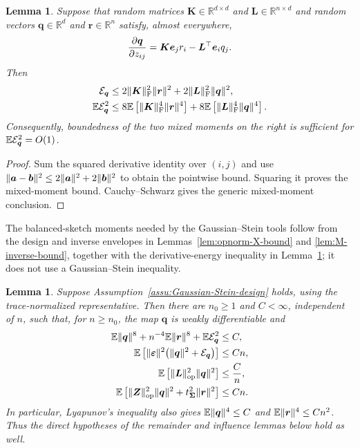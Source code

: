 \documentclass{article}
\theoremstyle{plain}
\newtheorem{lemma}[theorem]{Lemma}
\theoremstyle{definition}
\theoremstyle{definition}
\DeclarePairedDelimiter\norm{\lVert}{\rVert}
\def\R{{\mathbb{R}}}
\def\E{{\mathbb{E}}}
\def\mathbold{\boldsymbol}
\def\ba{\mathbold{a}}\def\bfa{\mathbold{a}}\def\ahat{\widehat{a}}\def\atil{\widetilde{a}}
\def\bb{\mathbold{b}}\def\bhat{\widehat{b}}\def\btil{\widetilde{b}}
\def\bK{\mathbold{K}}\def\hbK{{\widehat{\bK}}}\def\tbK{{\widetilde{\bK}}}
\def\bL{\mathbold{L}}\def\hbL{{\widehat{\bL}}}\def\tbL{{\widetilde{\bL}}}
\def\bq{\mathbold{q}}\def\qhat{\widehat{q}}\def\qtil{\widetilde{q}}\def\qbar{{\overline q}}
\def\br{\mathbold{r}}\def\rhat{\widehat{r}}\def\rtil{\widetilde{r}}\def\rbar{{\overline r}}
\def\be{\mathbold{e}}
\def\bZ{\mathbold{Z}}\def\hbZ{{\widehat{\bZ}}}\def\tbZ{{\widetilde{\bZ}}}
\def\ep{\varepsilon}\def\eps{\epsilon}\def\veps{\varepsilon}
\def\bep{ {\mathbold{\ep} }}
\def\bSigma{\mathbold{\Sigma}}\def\hbSigma{{\widehat{\bSigma}}}
\begin{document}
\begin{lemma}
\label{lem:derivative-energy-from-inverse-moments}
Suppose that random matrices $\bK\in\R^{d\times d}$ and
$\bL\in\R^{n\times d}$ and random vectors $\bq\in\R^d$ and
$\br\in\R^n$ satisfy, almost everywhere,
\begin{align*}
    \pdv{\bq}{z_{ij}}
       =\bK\be_jr_i-\bL^\top\be_iq_j.
\end{align*}
Then
\begin{align*}
    \calE_{\bq}
    &\leq2\norm{\bK}_{\rm F}^2\norm{\br}^2
       +2\norm{\bL}_{\rm F}^2\norm{\bq}^2,\\
    \E\calE_{\bq}^2
    &\leq8\E\left[\norm{\bK}_{\rm F}^4\norm{\br}^4\right]
       +8\E\left[\norm{\bL}_{\rm F}^4\norm{\bq}^4\right].
\end{align*}
Consequently, boundedness of the two mixed moments on the right is sufficient
for $\E\calE_{\bq}^2=O(1)$.
\end{lemma}

\begin{proof}
Sum the squared derivative identity over $(i,j)$ and use
$\norm{\ba-\bb}^2\leq2\norm{\ba}^2+2\norm{\bb}^2$ to obtain the pointwise
bound.  Squaring it proves the mixed-moment bound.  Cauchy--Schwarz gives the
generic mixed-moment conclusion.
\end{proof}

The balanced-sketch moments needed by the Gaussian--Stein tools follow
from the design and inverse
envelopes in Lemmas~\ref{lem:opnorm-X-bound} and
\ref{lem:M-inverse-bound}, together with the derivative-energy inequality in
Lemma~\ref{lem:derivative-energy-from-inverse-moments}; it does not use a
Gaussian--Stein inequality.

\begin{lemma}
\label{lem:balanced-Stein-sufficient-conditions}
Suppose Assumption~\ref{assu:Gaussian-Stein-design} holds, using the
trace-normalized
representative.  Then there are $n_0\geq1$ and $C<\infty$,
independent of $n$, such that, for $n\geq n_0$, the map $\bq$ is weakly
differentiable and
\begin{align}
    \E\norm{\bq}^{8}
       +n^{-4}\E\norm{\br}^{8}
       +\E\calE_{\bq}^{2}
    &\leq C,\notag\\
    \E\left[
       \norm{\bep}^{2}
       \bigl(\norm{\bq}^{2}+\calE_{\bq}\bigr)
    \right]
    &\leq Cn,\notag\\
    \E\left[
       \norm{\bL}_{\rm op}^{2}\norm{\bq}^{2}
    \right]
    &\leq \frac{C}{n},\notag\\
    \E\left[
       \norm{\bZ}_{\rm op}^{2}\norm{\bq}^{2}
       +t_{\bSigma}^{2}\norm{\br}^{2}
    \right]
    &\leq Cn.
    \label{eq:balanced-Stein-sufficient-conditions}
\end{align}
In particular, Lyapunov's inequality also gives
$\E\norm{\bq}^{4}\leq C$ and
$\E\norm{\br}^{4}\leq Cn^2$.  Thus the direct hypotheses of the remainder
and influence lemmas below hold as well.
\end{lemma}
\end{document}
